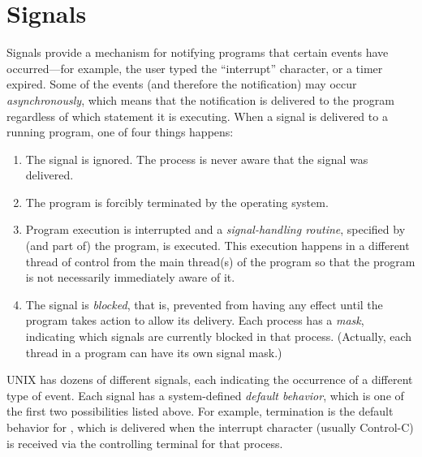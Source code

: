 \section{Signals}
\label{sect:signals}%

\noindent Signals provide a mechanism for notifying programs that certain events
have occurred---for example,
the user typed the ``interrupt'' character, or a timer expired.
Some of the events (and therefore the notification)
may occur \emph{asynchronously}, 
which means that the notification is delivered to the
program regardless of which statement it is executing.
When a signal is delivered to a running program,
one of four things happens:

\begin{enumerate}
\item The signal is ignored. The process is never aware that the signal was
delivered.
\item The program is forcibly terminated by the operating system.
\item Program execution is interrupted and
a \emph{signal-handling routine}, specified by (and part of) the
program, is executed. This execution happens in a different thread
of control from the main thread(s) of  the program so that the
program is not necessarily immediately aware of it.
\item The signal is \emph{blocked}, that is, prevented from having any effect
until the program takes action to allow its delivery.
Each process has a \emph{mask}, indicating which signals are
currently blocked in that process. (Actually, each thread in a
program can have its own signal mask.)
\end{enumerate}

UNIX has dozens of different signals, each indicating the occurrence
of a different type of event.
Each signal has a system-defined \emph{default behavior}, which is one of
the first two possibilities listed above.  For example, termination is the
default behavior for ,
which is delivered when the interrupt  character  (usually Control-C)
is received via the controlling terminal for that process.

